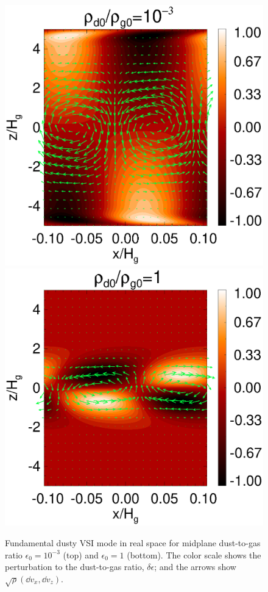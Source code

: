 \begin{figure}
\includegraphics[scale=0.32, clip=true, trim=0.5cm 0cm 3cm 0cm]{figures/result2d_dg1d-3.ps}\includegraphics[scale=0.32, clip=true, trim=1.8cm 0cm 0cm 0cm]{figures/result2d_dg1.ps}
  \caption{Fundamental dusty VSI mode in real space for midplane dust-to-gas
    ratio $\epsilon_0=10^{-3}$ (top) and $\epsilon_0=1$
    (bottom). The color scale shows the perturbation to the
    dust-to-gas ratio, $\delta\epsilon$; and the arrows show
    $\sqrt{\rho}\left(\dd v_x, \dd v_z\right)$. 
    \label{vsi_dust_loading2d}
    }
\end{figure}






